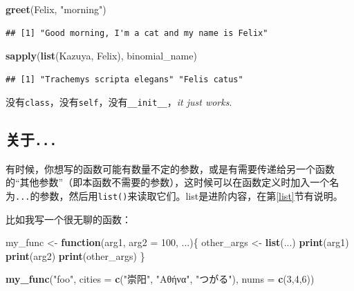 \documentclass[]{book}
\newenvironment{Shaded}{\begin{snugshade}}{\end{snugshade}}
\newcommand{\ControlFlowTok}[1]{\textcolor[rgb]{0.13,0.29,0.53}{\textbf{#1}}}
\newcommand{\DataTypeTok}[1]{\textcolor[rgb]{0.13,0.29,0.53}{#1}}
\newcommand{\DecValTok}[1]{\textcolor[rgb]{0.00,0.00,0.81}{#1}}
\newcommand{\KeywordTok}[1]{\textcolor[rgb]{0.13,0.29,0.53}{\textbf{#1}}}
\newcommand{\NormalTok}[1]{#1}
\newcommand{\StringTok}[1]{\textcolor[rgb]{0.31,0.60,0.02}{#1}}
\begin{document}
\begin{Shaded}
\begin{Highlighting}[]
\KeywordTok{greet}\NormalTok{(Felix, }\StringTok{"morning"}\NormalTok{)}
\end{Highlighting}
\end{Shaded}

\begin{verbatim}
## [1] "Good morning, I'm a cat and my name is Felix"
\end{verbatim}

\begin{Shaded}
\begin{Highlighting}[]
\KeywordTok{sapply}\NormalTok{(}\KeywordTok{list}\NormalTok{(Kazuya, Felix), binomial_name)}
\end{Highlighting}
\end{Shaded}

\begin{verbatim}
## [1] "Trachemys scripta elegans" "Felis catus"
\end{verbatim}

没有\texttt{class}，没有\texttt{self}，没有\texttt{\_\_init\_\_}，\emph{it just works}.

\hypertarget{...}{%
\subsection{\texorpdfstring{关于\texttt{...}}{关于...}}\label{...}}

有时候，你想写的函数可能有数量不定的参数，或是有需要传递给另一个函数的``其他参数''（即本函数不需要的参数），这时候可以在函数定义时加入一个名为\texttt{...}的参数，然后用\texttt{list()}来读取它们。list是进阶内容，在第\ref{list}节有说明。

比如我写一个很无聊的函数：

\begin{Shaded}
\begin{Highlighting}[]
\NormalTok{my_func <-}\StringTok{ }\ControlFlowTok{function}\NormalTok{(arg1, }\DataTypeTok{arg2 =} \DecValTok{100}\NormalTok{, ...)\{}
\NormalTok{  other_args <-}\StringTok{ }\KeywordTok{list}\NormalTok{(...)}
  \KeywordTok{print}\NormalTok{(arg1)}
  \KeywordTok{print}\NormalTok{(arg2)}
  \KeywordTok{print}\NormalTok{(other_args)}
\NormalTok{\}}

\KeywordTok{my_func}\NormalTok{(}\StringTok{"foo"}\NormalTok{, }\DataTypeTok{cities =} \KeywordTok{c}\NormalTok{(}\StringTok{"崇阳"}\NormalTok{, }\StringTok{"Αθήνα"}\NormalTok{, }\StringTok{"つがる"}\NormalTok{), }\DataTypeTok{nums =} \KeywordTok{c}\NormalTok{(}\DecValTok{3}\NormalTok{,}\DecValTok{4}\NormalTok{,}\DecValTok{6}\NormalTok{))}
\end{Highlighting}
\end{Shaded}
\end{document}
